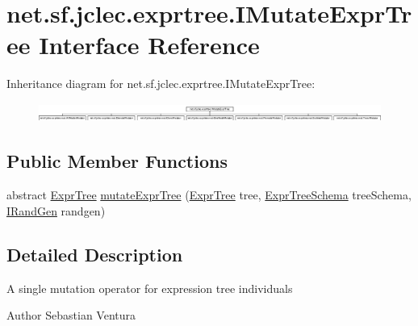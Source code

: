 \hypertarget{interfacenet_1_1sf_1_1jclec_1_1exprtree_1_1_i_mutate_expr_tree}{\section{net.\-sf.\-jclec.\-exprtree.\-I\-Mutate\-Expr\-Tree Interface Reference}
\label{interfacenet_1_1sf_1_1jclec_1_1exprtree_1_1_i_mutate_expr_tree}
}
Inheritance diagram for net.\-sf.\-jclec.\-exprtree.\-I\-Mutate\-Expr\-Tree\-:\begin{figure}[H]
\begin{center}
\leavevmode
\includegraphics[height=0.622568cm]{interfacenet_1_1sf_1_1jclec_1_1exprtree_1_1_i_mutate_expr_tree}
\end{center}
\end{figure}
\subsection*{Public Member Functions}
\begin{DoxyCompactItemize}
\item 
abstract \hyperlink{classnet_1_1sf_1_1jclec_1_1exprtree_1_1_expr_tree}{Expr\-Tree} \hyperlink{interfacenet_1_1sf_1_1jclec_1_1exprtree_1_1_i_mutate_expr_tree_aa3d6090a4580d9cd5f0e6a834df8a535}{mutate\-Expr\-Tree} (\hyperlink{classnet_1_1sf_1_1jclec_1_1exprtree_1_1_expr_tree}{Expr\-Tree} tree, \hyperlink{classnet_1_1sf_1_1jclec_1_1exprtree_1_1_expr_tree_schema}{Expr\-Tree\-Schema} tree\-Schema, \hyperlink{interfacenet_1_1sf_1_1jclec_1_1util_1_1random_1_1_i_rand_gen}{I\-Rand\-Gen} randgen)
\end{DoxyCompactItemize}


\subsection{Detailed Description}
A single mutation operator for expression tree individuals

\begin{DoxyAuthor}{Author}
Sebastian Ventura 
\end{DoxyAuthor}


